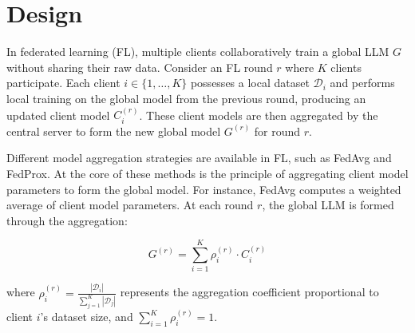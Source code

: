 
\section{\tool Design}

In federated learning (FL), multiple clients collaboratively train a global LLM $G$ without sharing their raw data.
Consider an FL round $r$ where $K$ clients participate.
Each client $i \in \{1, \ldots, K\}$ possesses a local dataset $\mathcal{D}_i$ and performs local training on the global model from the previous round, producing an updated client model $C_i^{(r)}$.
These client models are then aggregated by the central server to form the new global model $G^{(r)}$ for round $r$.

Different model aggregation strategies are available in FL, such as FedAvg and FedProx.
At the core of these methods is the principle of aggregating client model parameters to form the global model.
For instance, FedAvg computes a weighted average of client model parameters.
At each round $r$, the global LLM is formed through the aggregation:

\begin{equation}
  \label{eq:fedavg-aggregation}
  G^{(r)} = \sum_{i=1}^K \rho_i^{(r)} \cdot C_i^{(r)}
\end{equation}

where $\rho_i^{(r)} = \frac{|\mathcal{D}_i|}{\sum_{j=1}^K |\mathcal{D}_j|}$ represents the aggregation coefficient proportional to client $i$'s dataset size, and $\sum_{i=1}^K \rho_i^{(r)} = 1$.

